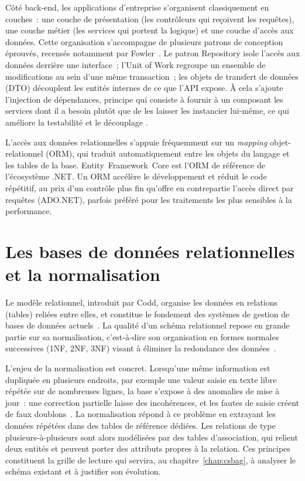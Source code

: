 Côté back-end, les applications d'entreprise s'organisent classiquement en
couches~: une couche de présentation (les contrôleurs qui reçoivent les
requêtes), une couche métier (les services qui portent la logique) et une couche
d'accès aux données. Cette organisation s'accompagne de plusieurs patrons de
conception éprouvés, recensés notamment par Fowler~\cite{fowler2002poeaa}. Le
patron Repository isole l'accès aux données derrière une interface~; l'Unit of
Work regroupe un ensemble de modifications au sein d'une même transaction~; les
objets de transfert de données (DTO) découplent les entités internes de ce que
l'API expose. À cela s'ajoute l'injection de dépendances, principe qui consiste
à fournir à un composant les services dont il a besoin plutôt que de les laisser
les instancier lui-même, ce qui améliore la testabilité et le découplage
.

L'accès aux données relationnelles s'appuie fréquemment sur un
\textit{mapping} objet-relationnel (ORM), qui traduit automatiquement entre les
objets du langage et les tables de la base. Entity~Framework~Core est l'ORM de
référence de l'écosystème .NET. Un ORM accélère le
développement et réduit le code répétitif, au prix d'un contrôle plus fin qu'offre
en contrepartie l'accès direct par requêtes (ADO.NET), parfois préféré pour les
traitements les plus sensibles à la performance.

\section{Les bases de données relationnelles et la normalisation}
\label{sec:normalisation}

Le modèle relationnel, introduit par Codd, organise les données en relations
(tables) reliées entre elles, et constitue le fondement des systèmes de gestion
de bases de données actuels~\cite{codd1970relational}. La qualité d'un schéma
relationnel repose en grande partie sur sa normalisation, c'est-à-dire son
organisation en formes normales successives (1NF, 2NF, 3NF) visant à éliminer la
redondance des données~\cite{codd1972normalization}.

L'enjeu de la normalisation est concret. Lorsqu'une même information est dupliquée
en plusieurs endroits, par exemple une valeur saisie en texte libre répétée sur
de nombreuses lignes, la base s'expose à des anomalies de mise à jour~: une
correction partielle laisse des incohérences, et les fautes de saisie créent de
faux doublons~\cite{elmasri2016fundamentals}. La normalisation répond à ce
problème en extrayant les données répétées dans des tables de référence
dédiées. Les relations de type plusieurs-à-plusieurs sont alors modélisées par
des tables d'association, qui relient deux entités et peuvent porter des
attributs propres à la relation. Ces principes
constituent la grille de lecture qui servira, au chapitre~\ref{chap:csbag}, à
analyser le schéma existant et à justifier son évolution.


